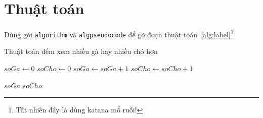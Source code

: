 \section{Thuật toán}
Dùng gói \texttt{algorithm} và \texttt{algpseudocode} để gõ đoạn thuật toán~\ref{alg:label}\footnote{Tất nhiên đây là dùng katana mổ ruồi!}

\begin{algorithm}
\caption{Thuật toán đếm xem nhiều gà hay nhiều chó hơn}
\label{alg:label}
\begin{algorithmic}
\State $soGa \gets 0$
\State $soCho \gets 0$
\State $soGa \gets soGa + 1$
\EndFor
{}
\State $soCho \gets soCho + 1$
\EndFor

\State\Return $soGa$
\EndIf
\State\Return $soCho$
\EndFunction
\end{algorithmic}
\end{algorithm}